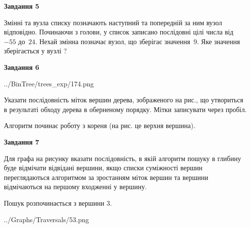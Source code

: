 \documentclass[12pt, ukrainian]{article}
\begin{document}
{\begin {large}
{\begin {center}\textbf{Завдання 5}\end {center}}\par
Змінні  та  вузла списку позначають наступний та попередній за ним вузол відповідно. Починаючи з голови, у список записано послідовні цілі числа від~$-55$ до~$24$. Нехай змінна  позначає вузол, що зберігає значення~$9$.
Яке значення зберігається у вузлі  ?\par
\newpage

{\begin {center}\textbf{Завдання 6}\end {center}}\par

\begin{center}
	{../BinTree/trees_exp/174.png}
\end{center}
Указати послідовність міток вершин дерева, зображеного на рис., що утвориться в результаті обходу дерева в оберненому порядку. Мітки записувати через пробіл.\par Алгоритм починає роботу з кореня (на рис. це верхня вершина).\par
\newpage

{\begin {center}\textbf{Завдання 7}\end {center}}\par
Для графа на рисунку вказати послідовність, в якій алгоритм пошуку в глибину буде відмічати відвідані вершини, якщо списки суміжності вершин переглядаються алгоритмом за зростанням міток вершин та вершини відмічаються на першому вход\-женні у вершину.\par
Пошук розпочинається з вершини 3.\par

\begin{center}
	{../Graphs/Traversals/53.png}
\end{center}\par
\newpage


\end{large}}
\end{document}
